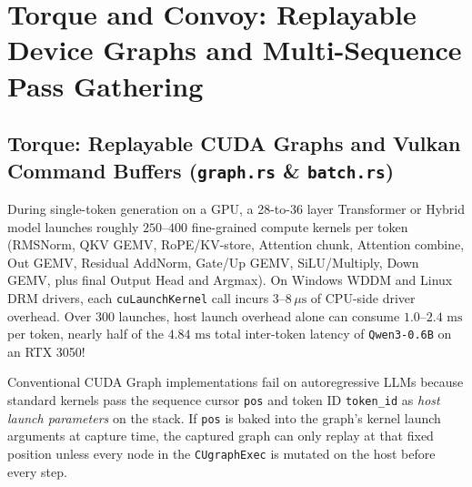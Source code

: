 \documentclass[10pt,a4paper]{article}
\theoremstyle{swzstyle}
\newcommand{\code}[1]{\texttt{#1}}
\begin{document}
\section{Torque and Convoy: Replayable Device Graphs and Multi-Sequence Pass Gathering}

\subsection{Torque: Replayable CUDA Graphs and Vulkan Command Buffers (\texttt{graph.rs} \& \texttt{batch.rs})}

During single-token generation on a GPU, a 28-to-36 layer Transformer or Hybrid model launches roughly $250\text{--}400$ fine-grained compute kernels per token (RMSNorm, QKV GEMV, RoPE/KV-store, Attention chunk, Attention combine, Out GEMV, Residual AddNorm, Gate/Up GEMV, SiLU/Multiply, Down GEMV, plus final Output Head and Argmax). On Windows WDDM and Linux DRM drivers, each \code{cuLaunchKernel} call incurs $3\text{--}8\,\mu\text{s}$ of CPU-side driver overhead. Over $300$ launches, host launch overhead alone can consume $1.0\text{--}2.4\text{ ms}$ per token, nearly half of the $4.84\text{ ms}$ total inter-token latency of \code{Qwen3-0.6B} on an RTX 3050!

Conventional CUDA Graph implementations fail on autoregressive LLMs because standard kernels pass the sequence cursor \code{pos} and token ID \code{token\_id} as \emph{host launch parameters} on the stack. If \code{pos} is baked into the graph's kernel launch arguments at capture time, the captured graph can only replay at that fixed position unless every node in the \code{CUgraphExec} is mutated on the host before every step.
\end{document}

